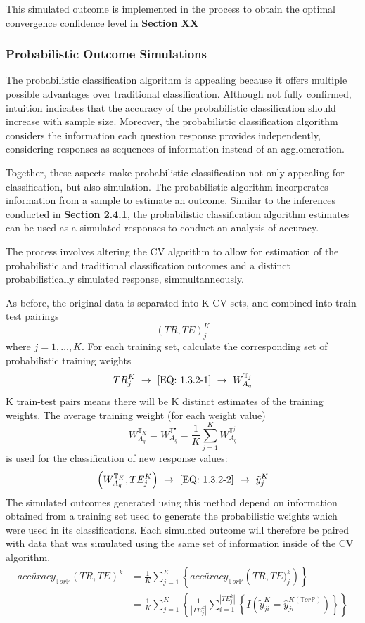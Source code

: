 \documentclass[12pt,]{article}
\begin{document}
This simulated outcome is implemented in the process to obtain the
optimal convergence confidence level in \textbf{Section XX}

\hypertarget{probabilistic-outcome-simulations}{%
\subsubsection{Probabilistic Outcome
Simulations}\label{probabilistic-outcome-simulations}}

The probabilistic classification algorithm is appealing because it
offers multiple possible advantages over traditional classification.
Although not fully confirmed, intuition indicates that the accuracy of
the probabilistic classification should increase with sample size.
Moreover, the probabilistic classification algorithm considers the
information each question response provides independently, considering
responses as sequences of information instead of an agglomeration.

Together, these aspects make probabilistic classification not only
appealing for classification, but also simulation. The probabilistic
algorithm incorperates information from a sample to estimate an outcome.
Similar to the inferences conducted in \textbf{Section 2.4.1}, the
probabilistic classification algorithm estimates can be used as a
simulated responses to conduct an analysis of accuracy.

The process involves altering the CV algorithm to allow for estimation
of the probabilistic and traditional classification outcomes and a
distinct probabilistically simulated response, simmultanneously.

As before, the original data is separated into K-CV sets, and combined
into train-test pairings \[(TR, TE)_{j}^{K}\] where \(j =1, \ldots, K\).
For each training set, calculate the corresponding set of probabilistic
training weights
\[TR_{j}^{K} \ \rightarrow \ \eqref{EQ: 1.3.2-1} \ \rightarrow \  W_{A_{q}}^{\mathbb{T}_{j}}\]
K train-test pairs means there will be K distinct estimates of the
training weights. The average training weight (for each weight value)
\[W_{A_{q}}^{\mathbb{T}_{K}}= W_{A_{q}}^{\mathbb{T}^{\bullet}}=\frac{1}{K}\sum_{j=1}^{K} W_{A_{q}}^{\mathbb{T}^{j}}\]
is used for the classification of new response values:
\[\left(W_{A_{q}}^{\mathbb{T}_{K}}, TE_{j}^{K}\right)  \ \rightarrow \  \eqref{EQ: 1.3.2-2} \ \rightarrow \   \tilde{y}_{j}^{K}\]
The simulated outcomes generated using this method depend on information
obtained from a training set used to generate the probabilistic weights
which were used in its classifications. Each simulated outcome will
therefore be paired with data that was simulated using the same set of
information inside of the CV algorithm. \begin{align*}
  \tilde{accuracy}_{\mathbb{T}or\mathbb{P}}\left(TR, TE \right)^{k} &= \frac{1}{K}\sum_{j=1}^{K} \left \{\tilde{accuracy}_{\mathbb{T}or\mathbb{P}} \left(TR, TE)_{j}^{k}   \right)   \right \} \\
  &= \frac{1}{K}\sum_{j=1}^{K} \left \{ \frac{1}{|TE_{j}^{k}|} \sum_{i=1}^{|TE_{j}^{k}|} \left \{ I\left(\tilde{y}_{ji}^{K}=\hat{y}_{ji}^{K\left(\mathbb{T}or\mathbb{P} \right) } \right) \right \}   \right \}
\end{align*}
\end{document}
